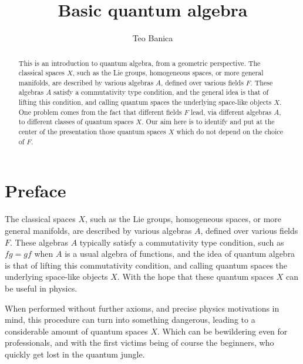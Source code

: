 \documentclass[12pt]{amsbook}
\begin{document}
\title{Basic quantum algebra}

\author{Teo Banica}
\address{Department of Mathematics, University of Cergy-Pontoise, F-95000 Cergy-Pontoise, France. {\tt teo.banica@gmail.com}}


\begin{abstract}
This is an introduction to quantum algebra, from a geometric perspective. The classical spaces $X$, such as the Lie groups, homogeneous spaces, or more general manifolds, are described by various algebras $A$, defined over various fields $F$. These algebras $A$ satisfy a commutativity type condition, and the general idea is that of lifting this condition, and calling quantum spaces the underlying space-like objects $X$. One problem comes from the fact that different fields $F$ lead, via different algebras $A$, to different classes of quantum spaces $X$. Our aim here is to identify and put at the center of the presentation those quantum spaces $X$ which do not depend on the choice of $F$.
\end{abstract}

\maketitle

\chapter*{Preface}

The classical spaces $X$, such as the Lie groups, homogeneous spaces, or more general manifolds, are described by various algebras $A$, defined over various fields $F$. These algebras $A$ typically satisfy a commutativity type condition, such as $fg=gf$ when $A$ is a usual algebra of functions, and the idea of quantum algebra is that of lifting this commutativity condition, and calling quantum spaces the underlying space-like objects $X$. With the hope that these quantum spaces $X$ can be useful in physics.

\bigskip

When performed without further axioms, and precise physics motivations in mind, this procedure can turn into something dangerous, leading to a considerable amount of quantum spaces $X$. Which can be bewildering even for professionals, and with the first victims being of course the beginners, who quickly get lost in the quantum jungle.
\end{document}

